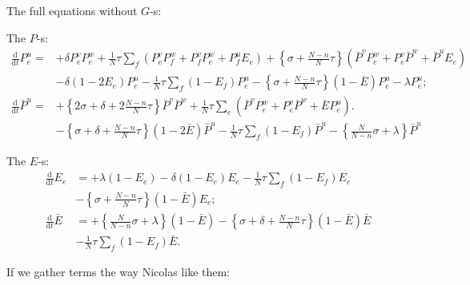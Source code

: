 \documentclass[preprint, 
superscriptaddress,aip,author-year]{revtex4-1}
\begin{document}
The full equations without $G$-s: 

\noindent The $P$-s:
\begin{align}
 \frac{\mathrm{d}}{\mathrm{d} t} P_e^u  =&  
+ \delta P_e^v  P_e^w 
+ \frac{1}{N} \tau \sum_f  \left( P_e^v P_f^w + P_f^v P_e^w + P_f^u E_e \right) 
+ \left\{ \sigma + \frac{N-n}{N} \tau \right\}\left(  \bar P^v P_e^w +P_e^v \bar P^w + \bar P^u  E_e\right)  
\nonumber \\
&   - \delta (1- 2 E_e) P_e^u -  \frac{1}{N} \tau \sum_{f
 }(1-E_f) P_e^u   -  \left\{ \sigma  + \frac{N-n}{N} \tau \right\}
 (1-\bar E)  P_e^u - \lambda P_e^u;
\tag{PE}\\ 
\frac{\mathrm{d}}{\mathrm{d} t}  \bar P^u =&  +\left\{ 2 \sigma+
  \delta + 2 \frac{N-n}{N} \tau \right\} \bar P^v \bar P^w 
+ \frac{1}{N}\tau \sum_e \left( \bar P^v P_e^w +  P_e^v \bar P^w + \bar E P_e^u \right). 
\nonumber \\
& -\left\{\sigma + \delta + \frac{N-n}{N} \tau \right\} (1-2\bar E )
\bar P^u -  \frac{1}{N}\tau\sum_{f} (1-E_f) \bar P^u
-  \left\{\frac {N}{N-n} \sigma + \lambda \right\}  \bar P^u
\tag{PB}
\end{align}


\noindent The $E$-s:
\begin{align}
\frac{\mathrm{d}}{\mathrm{d} t} E_e &=
+ \lambda  (1-E_e) - \delta (1-E_e) E_e
-\frac{1}{N} \tau\sum_{f } (1-E_f)  E_e \nonumber \\
&
- \left\{\sigma +\frac{N-n}{N} \tau  \right\} (1-\bar E)  E_e;  
\tag{EE} \\
\frac{\mathrm{d}}{\mathrm{d} t} {\bar E} &=
+ \left\{\frac{N}{N-n} \sigma + \lambda \right\}(1-\bar E )  
-  \left\{ \sigma  + \delta +  \frac{N-n}{N} \tau\right\} (1-\bar E ) \bar E \nonumber \\
&
- \frac{1}{N} \tau\sum_{f } (1-E_f) \bar E. 
\tag{EB} 
 \end{align}

\newpage
If we gather terms the way Nicolas like them:
\end{document}
